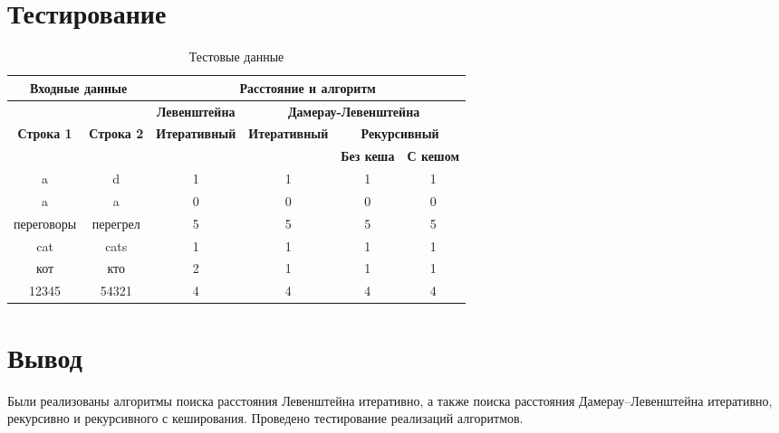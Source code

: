 \section{Тестирование}
\begin{table}[ht]
	\small
	\begin{center}
		\begin{threeparttable}
		\label{tbl:func_tests}
		\begin{tabular}{|c|c|c|c|c|c|}
			\hline
			\multicolumn{2}{|c|}{\bfseries Входные данные}
			& \multicolumn{4}{c|}{\bfseries Расстояние и алгоритм} \\ 
			\hline 
			&
			& \multicolumn{1}{c|}{\bfseries Левенштейна} 
			& \multicolumn{3}{c|}{\bfseries Дамерау-Левенштейна} \\ \cline{3-6}
			
			\bfseries Строка 1 & \bfseries Строка 2 & \bfseries Итеративный & \bfseries Итеративный
			
			& \multicolumn{2}{c|}{\bfseries Рекурсивный} \\ \cline{5-6}
			& & & & \bfseries Без кеша & \bfseries С кешом \\
			\hline
			a & d & 1 & 1 & 1 & 1 \\
			\hline
			a & a & 0 & 0 & 0 & 0 \\
			\hline
			переговоры & перегрел & 5 & 5 & 5 & 5 \\
			\hline
			cat & cats & 1 & 1 & 1 & 1 \\
			\hline
			кот & кто & 2 & 1 & 1 & 1 \\
			\hline
			12345 & 54321 & 4 & 4 & 4 & 4 \\
			\hline
		\end{tabular}	
        \caption{Тестовые данные}
		\end{threeparttable}
	\end{center}
\end{table}

\section*{Вывод}
Были реализованы алгоритмы поиска расстояния Левенштейна итеративно,
а также поиска расстояния Дамерау–Левенштейна итеративно, рекурсивно и рекурсивного с кеширования. Проведено тестирование реализаций алгоритмов.


